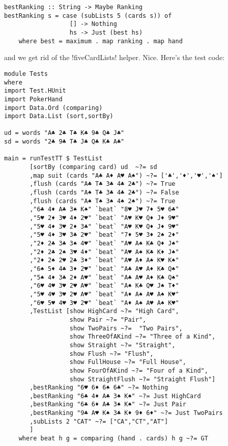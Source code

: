 \begin{lstlisting}[frame=single]
bestRanking :: String -> Maybe Ranking
bestRanking s = case (subLists 5 (cards s)) of
                  [] -> Nothing
                  hs -> Just (best hs)
    where best = maximum . map ranking . map hand
\end{lstlisting}
\success and we get rid of the \il!fiveCardLists! helper. 
\newpage
\lhN Nice. Here's the test code:
\begin{lstlisting}[frame=single]
module Tests
where 
import Test.HUnit
import PokerHand
import Data.Ord (comparing)
import Data.List (sort,sortBy)

ud = words "A♣ 2♣ T♣ K♣ 9♣ Q♣ J♣"
sd = words "2♣ 9♣ T♣ J♣ Q♣ K♣ A♣"

main = runTestTT $ TestList 
       [sortBy (comparing card) ud  ~?= sd
       ,map suit (cards "A♣ A♦ A♥ A♠") ~?= ['♣','♦','♥','♠']
       ,flush (cards "A♣ T♣ 3♣ 4♣ 2♣") ~?= True
       ,flush (cards "A♠ T♣ 3♣ 4♣ 2♣") ~?= False
       ,flush (cards "A♠ T♠ 3♠ 4♠ 2♠") ~?= True
       ,"6♣ 4♦ A♣ 3♠ K♠" `beat` "8♥ J♥ 7♦ 5♥ 6♣"
       ,"5♥ 2♦ 3♥ 4♦ 2♥" `beat` "A♥ K♥ Q♦ J♦ 9♥"
       ,"5♥ 4♦ 3♥ 2♦ 3♣" `beat` "A♥ K♥ Q♦ J♦ 9♥"
       ,"5♥ 4♦ 3♥ 3♣ 2♥" `beat` "7♦ 5♥ 3♦ 2♠ 2♦"
       ,"2♦ 2♣ 3♣ 3♠ 4♥" `beat` "A♥ A♠ K♣ Q♦ J♠"  
       ,"2♦ 2♣ 2♠ 3♥ 4♦" `beat` "A♥ A♠ K♣ K♦ J♠"
       ,"2♦ 2♠ 2♥ 2♣ 3♦" `beat` "A♥ A♦ A♠ K♥ K♠"
       ,"6♠ 5♦ 4♣ 3♦ 2♥" `beat` "A♣ A♥ A♦ K♣ Q♠"
       ,"5♠ 4♦ 3♣ 2♦ A♥" `beat` "A♣ A♥ A♦ K♣ Q♠"
       ,"6♥ 4♥ 3♥ 2♥ A♥" `beat` "A♠ K♣ Q♥ J♠ T♦"
       ,"5♥ 4♥ 3♥ 2♥ A♥" `beat` "A♦ A♠ A♥ A♠ K♥"
       ,"6♥ 5♥ 4♥ 3♥ 2♥" `beat` "A♦ A♠ A♥ A♠ K♥"
       ,TestList [show HighCard ~?= "High Card",
                  show Pair ~?= "Pair",
                  show TwoPairs ~?=  "Two Pairs",
                  show ThreeOfAKind ~?= "Three of a Kind",
                  show Straight ~?= "Straight",
                  show Flush ~?= "Flush",
                  show FullHouse ~?= "Full House",
                  show FourOfAKind ~?= "Four of a Kind",
                  show StraightFlush ~?= "Straight Flush"] 
       ,bestRanking "6♥ 6♦ 6♠ 6♣" ~?= Nothing
       ,bestRanking "6♣ 4♦ A♣ 3♠ K♠" ~?= Just HighCard
       ,bestRanking "6♣ 6♦ A♣ 3♠ K♠" ~?= Just Pair
       ,bestRanking "9♣ A♥ K♠ 3♣ K♦ 9♦ 6♦" ~?= Just TwoPairs
       ,subLists 2 "CAT" ~?= ["CA","CT","AT"]
       ]
    where beat h g = comparing (hand . cards) h g ~?= GT
\end{lstlisting} %

\lhend

